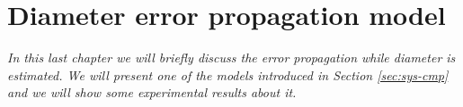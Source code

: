 \chapter{Diameter error propagation model}
\label{ch::diameter}

\textit{In this last chapter we will briefly discuss the error propagation while diameter is estimated. We will present one of the models introduced in Section \ref{sec:sys-cmp} and we will show some experimental results about it.}

  
  
